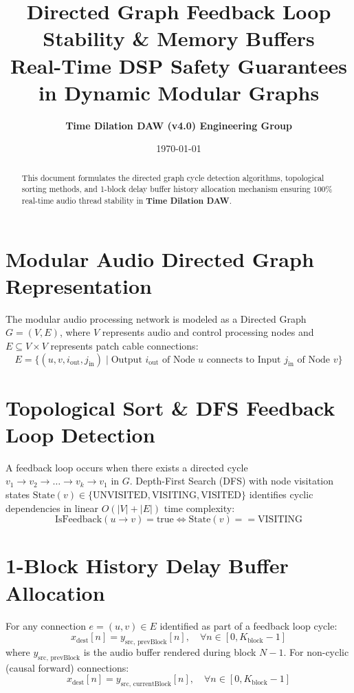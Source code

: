 \documentclass[11pt,a4paper]{article}
\title{\textbf{\Huge Directed Graph Feedback Loop Stability \& Memory Buffers}\\[0.5em]
\Large Real-Time DSP Safety Guarantees in Dynamic Modular Graphs}
\author{\textbf{Time Dilation DAW (v4.0) Engineering Group}}
\date{\today}
\begin{document}
\maketitle

\begin{abstract}
This document formulates the directed graph cycle detection algorithms, topological sorting methods, and 1-block delay buffer history allocation mechanism ensuring $100\%$ real-time audio thread stability in \textbf{Time Dilation DAW}.
\end{abstract}

\section{Modular Audio Directed Graph Representation}
The modular audio processing network is modeled as a Directed Graph $G = (V, E)$, where $V$ represents audio and control processing nodes and $E \subseteq V \times V$ represents patch cable connections:
\begin{equation}
E = \{ (u, v, i_{\text{out}}, j_{\text{in}}) \mid \text{Output } i_{\text{out}} \text{ of Node } u \text{ connects to Input } j_{\text{in}} \text{ of Node } v \}
\end{equation}

\section{Topological Sort \& DFS Feedback Loop Detection}
A feedback loop occurs when there exists a directed cycle $v_1 \to v_2 \to \dots \to v_k \to v_1$ in $G$.
Depth-First Search (DFS) with node visitation states $\text{State}(v) \in \{\text{UNVISITED}, \text{VISITING}, \text{VISITED}\}$ identifies cyclic dependencies in linear $O(|V| + |E|)$ time complexity:
\begin{equation}
\text{IsFeedback}(u \to v) = \text{true} \iff \text{State}(v) == \text{VISITING}
\end{equation}

\section{1-Block History Delay Buffer Allocation}
For any connection $e = (u, v) \in E$ identified as part of a feedback loop cycle:
\begin{equation}
x_{\text{dest}}[n] = y_{\text{src, prevBlock}}[n], \quad \forall n \in [0, K_{\text{block}}-1]
\end{equation}
where $y_{\text{src, prevBlock}}$ is the audio buffer rendered during block $N-1$.
For non-cyclic (causal forward) connections:
\begin{equation}
x_{\text{dest}}[n] = y_{\text{src, currentBlock}}[n], \quad \forall n \in [0, K_{\text{block}}-1]
\end{equation}
\end{document}
